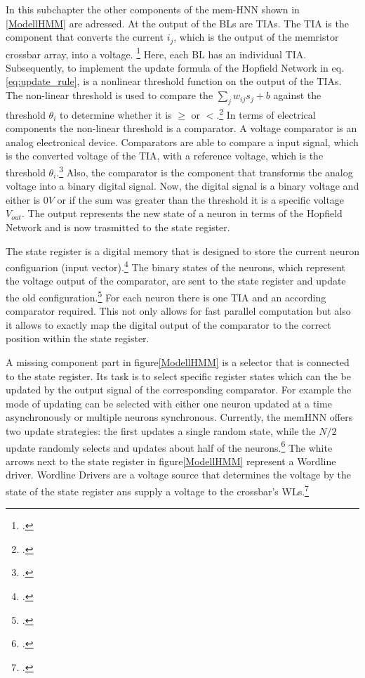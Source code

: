 In this subchapter the other components of the \ac{mem-HNN} shown in \ref{ModellHMM} are adressed.
At the output of the BLs are \ac{TIA}s.
The \ac{TIA} is the component that converts the current \(i_j\), which is the output of the memristor crossbar array, into a voltage. \footcite[cf.][3]{hizzaniMemristorbasedHardwareAlgorithms2023}
Here, each BL has an individual \ac{TIA}.
Subsequently, to implement the update formula of the Hopfield Network in eq.\eqref{eq:update_rule}, is a nonlinear threshold function on the output of the \ac{TIA}s.
The non-linear threshold is used to compare the \(\sum_j w_{ij} s_j + b\) against the threshold \(\theta_i\) to determine whether it is \(\geq\) or \(<\).\footcite[cf.][18]{caiHarnessingIntrinsicNoise2019}
In terms of electrical components the non-linear threshold is a comparator. 
A voltage comparator is an analog electronical device.
Comparators are able to compare a input signal, which is the converted voltage of the \ac{TIA}, with a reference voltage, which is the threshold \(\theta_i\).\footcite[cf.][28]{chenApplicationVoltageComparator2021}
Also, the comparator is the component that transforms the analog voltage into a binary digital signal.
Now, the digital signal is a binary voltage and either is \(0V\) or if the sum was greater than the threshold it is a specific voltage \(V_{out}\).
The output represents the new state of a neuron in terms of the Hopfield Network and is now trasmitted to the state register.

The state register is a digital memory that is designed to store the current neuron configuarion (input vector).\footcite[cf.][18]{caiHarnessingIntrinsicNoise2019}
The binary states of the neurons, which represent the voltage output of the comparator, are sent to the state register and update the old configuration.\footcite[cf.][3]{caiHarnessingIntrinsicNoise2019}
For each neuron there is one \ac{TIA} and an according comparator required. 
This not only allows for fast parallel computation but also it allows to exactly map the digital output of the comparator to the correct position within the state register.

A missing component part in figure\ref{ModellHMM} is a selector that is connected to the state register. 
Its task is to select specific register states which can the be updated by the output signal of the corresponding comparator.  
For example the mode of updating can be selected with either one neuron updated at a time asynchronously or multiple neurons synchronous. 
Currently, the memHNN offers two update strategies: the first updates a single random state, while the \(N/2\) update randomly selects and updates about half of the neurons.\footcite[cf.][3]{hizzaniMemristorbasedHardwareAlgorithms2023}
The white arrows next to the state register in figure\ref{ModellHMM} represent a Wordline driver. 
Wordline Drivers are a voltage source that determines the voltage by the state of the state register ans supply a voltage to the crossbar's WLs.\footcite[cf.][18]{caiHarnessingIntrinsicNoise2019}

